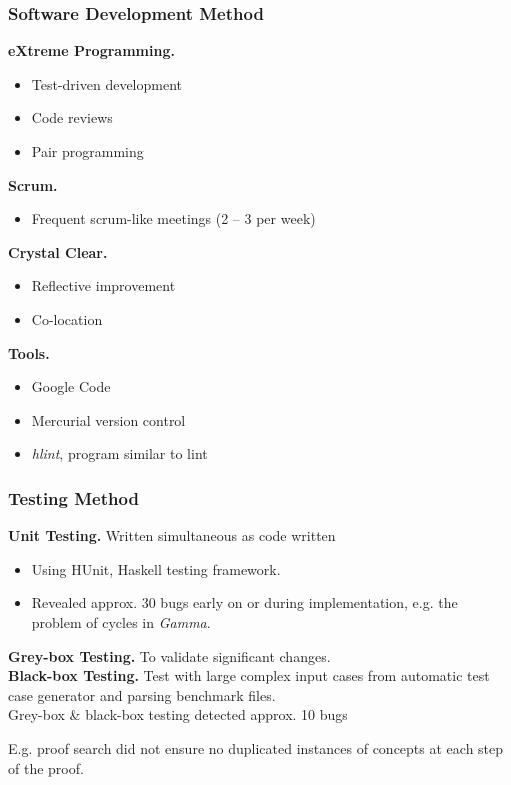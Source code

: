 \begin{frame}
  \frametitle{Software Development Method}
\textbf{eXtreme Programming.}
\begin{itemize}
\item Test-driven development
\item Code reviews
\item Pair programming
\end{itemize}

\textbf{Scrum.}
\begin{itemize}
\item Frequent scrum-like meetings (2 -- 3 per week)
\end{itemize}

\textbf{Crystal Clear.}
\begin{itemize}
\item Reflective improvement
\item Co-location
\end{itemize}

\textbf{Tools.}
\begin{itemize}
\item Google Code
\item Mercurial version control
\item \textit{hlint}, program similar to lint
\end{itemize}
\end{frame}


\begin{frame}
  \frametitle{Testing Method}
\textbf{Unit Testing.} Written simultaneous as code written
\begin{itemize}
\item Using HUnit, Haskell testing framework.
\item Revealed approx. 30 bugs early on or during implementation, e.g. the problem of cycles in \textit{Gamma}.
\end{itemize}
\bigskip
\textbf{Grey-box Testing.} To validate significant changes.\\
\bigskip
\textbf{Black-box Testing.} Test with large complex input cases from automatic test case generator and parsing benchmark files.\\
\bigskip
Grey-box \& black-box testing detected approx. 10 bugs

E.g. proof search did not ensure no duplicated instances of concepts at each step of the proof.
\end{frame}


